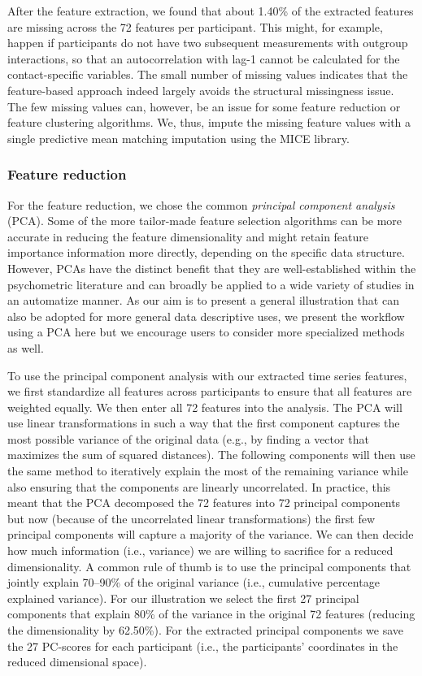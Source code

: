 After the feature extraction, we found that about 1.40\% of the
extracted features are missing across the 72 features per participant.
This might, for example, happen if participants do not have two
subsequent measurements with outgroup interactions, so that an
autocorrelation with lag-1 cannot be calculated for the contact-specific
variables. The small number of missing values indicates that the
feature-based approach indeed largely avoids the structural missingness
issue. The few missing values can, however, be an issue for some feature
reduction or feature clustering algorithms. We, thus, impute the missing
feature values with a single predictive mean matching imputation using
the MICE library.

\subsubsection{Feature reduction}

For the feature reduction, we chose the common
\textit{principal component analysis} (PCA). Some of the more
tailor-made feature selection algorithms can be more accurate in
reducing the feature dimensionality and might retain feature importance
information more directly, depending on the specific data structure.
However, PCAs have the distinct benefit that they are well-established
within the psychometric literature and can broadly be applied to a wide
variety of studies in an automatize manner. As our aim is to present a
general illustration that can also be adopted for more general data
descriptive uses, we present the workflow using a PCA here but we
encourage users to consider more specialized methods as well.

To use the principal component analysis with our extracted time series
features, we first standardize all features across participants to
ensure that all features are weighted equally. We then enter all 72
features into the analysis. The PCA will use linear transformations in
such a way that the first component captures the most possible variance
of the original data (e.g., by finding a vector that maximizes the sum
of squared distances). The following components will then use the same
method to iteratively explain the most of the remaining variance while
also ensuring that the components are linearly uncorrelated. In
practice, this meant that the PCA decomposed the 72 features into 72
principal components but now (because of the uncorrelated linear
transformations) the first few principal components will capture a
majority of the variance. We can then decide how much information (i.e.,
variance) we are willing to sacrifice for a reduced dimensionality. A
common rule of thumb is to use the principal components that jointly
explain 70--90\% of the original variance (i.e., cumulative percentage
explained variance). For our illustration we select the first 27
principal components that explain 80\% of the variance in the original
72 features (reducing the dimensionality by 62.50\%). For the extracted
principal components we save the 27 PC-scores for each participant
(i.e., the participants' coordinates in the reduced dimensional space).

